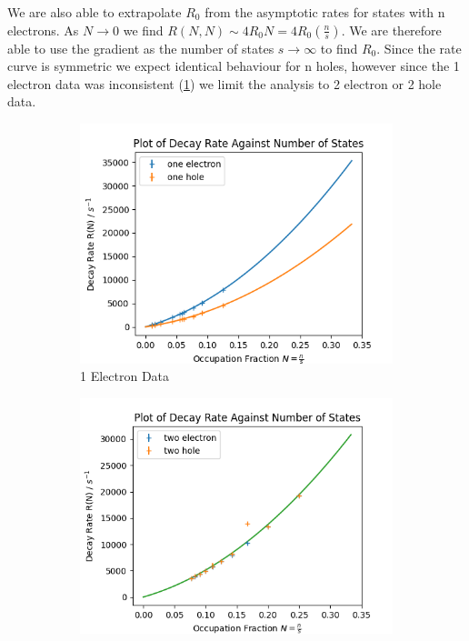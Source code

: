We are also able to extrapolate
\(R_0\) from the asymptotic
rates for states with n electrons.
As \(N\rightarrow{}0\)
we find
\(R(N,N) \sim{} 4 R_0 N = 4R_0 (\frac{n}{s})\).
We are therefore able to
use the gradient as the
number of states \(s\rightarrow{}\infty{}\)
to find \(R_0\).
Since the rate curve
is symmetric we expect
identical behaviour for
n holes, however
since the 1 electron
data was inconsistent (\cref{sub@fig:one electron rates})
we limit the analysis to 2 electron
or 2 hole data.
\begin{figure}[htbp]
    \centering
    \begin{subfigure}{0.45\linewidth}
        \centering
        \includegraphics[width =0.9 \linewidth]{Figures/Simulation/Decay rate against occupation n=1.png}
        \caption{1 Electron Data
        }\label{sub@fig:one electron rates}
    \end{subfigure}
    \begin{subfigure}{0.45\linewidth}
        \centering
        \includegraphics[width = 0.9\linewidth]{Figures/Simulation/Decay rate against occupation n=2.png}

\end{subfigure}
\end{figure}
